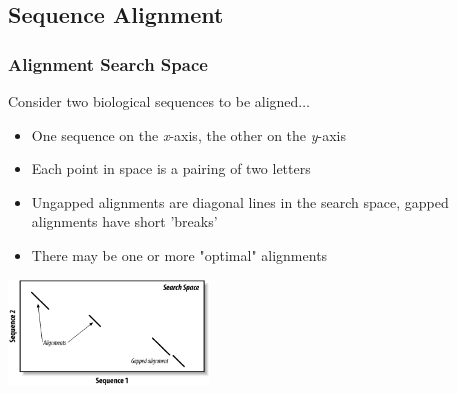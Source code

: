 \documentclass[table]{beamer}
\begin{document}
    \subsection{Sequence Alignment}

    \begin{frame}
     \frametitle{Alignment Search Space}
     Consider two biological sequences to be aligned$\ldots$
     \begin{itemize}
       \item One sequence on the \textit{x}-axis, the other on the \textit{y}-axis
       \item Each point in space is a pairing of two letters
       \item Ungapped alignments are diagonal lines in the search space, gapped alignments have short 'breaks'
       \item There may be one or more "optimal" alignments
     \end{itemize}
     \begin{center}
       \includegraphics[width=0.4\textwidth]{images/search_space} 
     \end{center}
   \end{frame}
    
\end{document}
